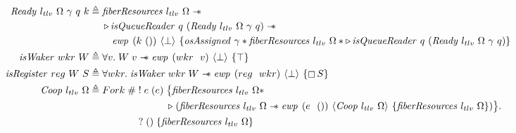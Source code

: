 \newpage
\begin{figure}[ht]
  \begin{align*}
    \gsReadyF{}~l_{tlv}~\Omega~\gamma~q~k & \triangleq \begin{aligned}[t]
                                                          & \gsFiberResources{l_{tlv}}{\Omega} \wand                                                                                                                 \\
                                                          & \later \gsIsQueueReader{}~q~(\gsReadyF{}~l_{tlv}~\Omega~\gamma~q) \wand                                                                                  \\
                                                          & \quad \ewp{k~()}{\bot}{\gspdone{\gamma} \ast \gsFiberResources{l_{tlv}}{\Omega} \ast \later \gsIsQueueReader{}~q~(\gsReadyF{}~l_{tlv}~\Omega~\gamma~q) }
                                                       \end{aligned} \\
    \gsIsWaker{}~wkr~W                    & \triangleq \forall v.   \;  W\; v \wand{} \ewp{wkr\ \ v}{\bot}{\top}                                                                                                                         \\
    \gsIsRegF{}~reg~W~S                   & \triangleq \forall wkr. \; \gsIsWaker{}\; wkr\; W \wand{} \ewp{reg\ \ wkr}{\bot}{\always S}                                                                                                  \\
    \protoF{}~l_{tlv}~\Omega              & \triangleq \begin{aligned}[t]
                                                         Fork\;       & \#\; \begin{aligned}[t]
                             & !\; e\; (e)\; \begin{aligned}[t]
                            & \big\{ \gsFiberResources{l_{tlv}}{\Omega} \ast                                                                                             \\
                            & \later\; (\gsFiberResources{l_{tlv}}{\Omega} \wand{} \ewp{e\ \ ()}{\protoF{}~l_{tlv}~\Omega}{\gsFiberResources{l_{tlv}}{\Omega}}) \big\} .
                         \end{aligned} \\
                             & ?\; ()\; \{ \gsFiberResources{l_{tlv}}{\Omega} \}

\end{aligned}
\end{aligned}
\end{align*}
\end{figure}
